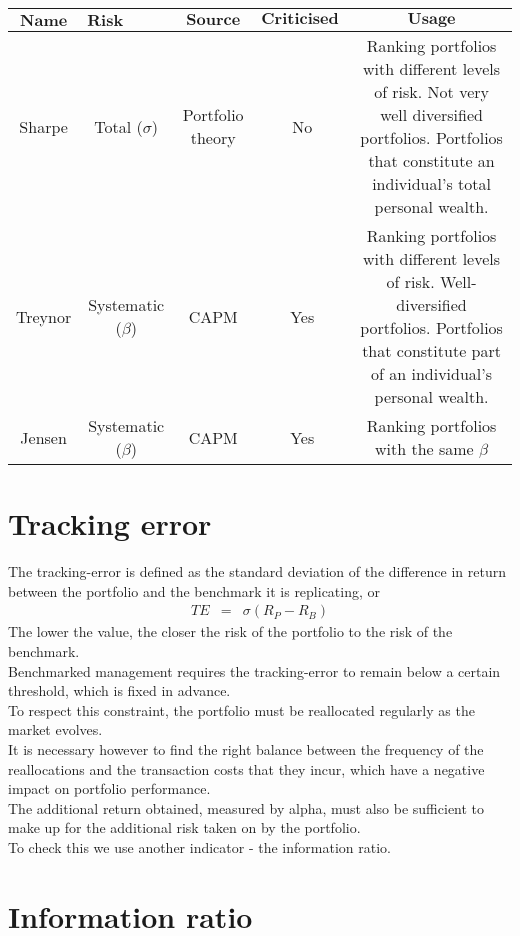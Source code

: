 \begin{tabular}{|c|c|c|c|c|}
	\hline 
	$\textbf{Name}$ & $\textbf{Risk Used}$ & $\textbf{Source}$ & $\textbf{Criticised by Roll}$ & $\textbf{Usage}$ \\ 
	\hline 
	Sharpe & Total ($\sigma$) & Portfolio theory & No & Ranking portfolios with different levels of risk. Not very well diversified portfolios. Portfolios that constitute an individual's total personal wealth. \\ 
	\hline 
	Treynor & Systematic ($\beta$) & CAPM & Yes & Ranking portfolios with different levels of risk. Well-diversified portfolios. Portfolios that constitute part of an individual's personal wealth. \\ 
	\hline 
	Jensen & Systematic ($\beta$) & CAPM & Yes & Ranking portfolios with the same $\beta$ \\ 
	\hline 
\end{tabular} 


\section{Tracking error}

The tracking-error is defined as the standard deviation of the difference in return between the portfolio and the benchmark it is replicating, or
\begin{eqnarray}
TE &=& \sigma(R_{P} - R_{B})
\end{eqnarray}
The lower the value, the closer the risk of the portfolio to the risk of the benchmark.\\
Benchmarked management requires the tracking-error to remain below a certain threshold, which is fixed in advance.\\
To respect this constraint, the portfolio must be reallocated regularly as the market evolves.\\
It is necessary however to find the right balance between the frequency of the reallocations and the transaction costs that they incur, which have a negative impact on portfolio performance.\\
The additional return obtained, measured by alpha, must also be sufficient to make up for the additional risk taken on by the portfolio.\\
To check this we use another indicator - the information ratio.


\section{Information ratio}

